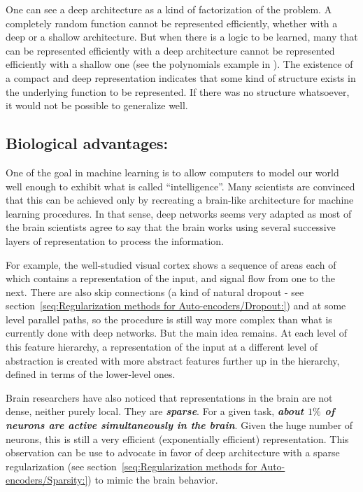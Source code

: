 \documentclass[a4paper,11pt]{report}
\newcommand{\Important}[1]{\textbf{{\em #1}}}
\begin{document}
			One can see a deep architecture as a kind of factorization of the problem. A completely random function cannot be represented efficiently, whether with a deep or a shallow architecture. But when there is a logic to be learned, many that can be represented efficiently with a deep architecture cannot be represented efficiently with a shallow one (see the polynomials example in \cite{Bengio_2009}). The existence of a compact and deep representation indicates that some kind of structure exists in the underlying function to be represented. If there was no structure whatsoever, it would not be possible to generalize well.
    
		\subsection{Biological advantages:}
			\label{subseq:Deep neural networks/Advantages of a deep architecture/Biological advantages}
			
			One of the goal in machine learning is to allow computers to model our world well enough to exhibit what is called ``intelligence''. Many scientists are convinced that this can be achieved only by recreating a brain-like architecture for machine learning procedures. In that sense, deep networks seems very adapted as most of the brain scientists agree to say that the brain works using several successive layers of representation to process the information.\\\par
			
			For example, the well-studied visual cortex shows a sequence of areas each of which contains a representation of the input, and signal flow from one to the next. There are also skip connections (a kind of natural dropout - see section~\ref{seq:Regularization methods for Auto-encoders/Dropout:}) and at some level parallel paths, so the procedure is still way more complex than what is currently done with deep networks. But the main idea remains. At each level of this feature hierarchy, a representation of the input at a different level of abstraction is created with more abstract features further up in the hierarchy, defined in terms of the lower-level ones.\\\par
      
			Brain researchers have also noticed that representations in the brain are not dense, neither purely local. They are \Important{sparse}. For a given task, \Important{about $1\%$ of neurons are active  simultaneously in the brain}. Given the huge number of neurons, this is still a very efficient (exponentially efficient) representation. This observation can be use to advocate in favor of deep architecture with a sparse regularization (see section~\ref{seq:Regularization methods for Auto-encoders/Sparsity:}) to mimic the brain behavior.\\\par
      
\end{document}
